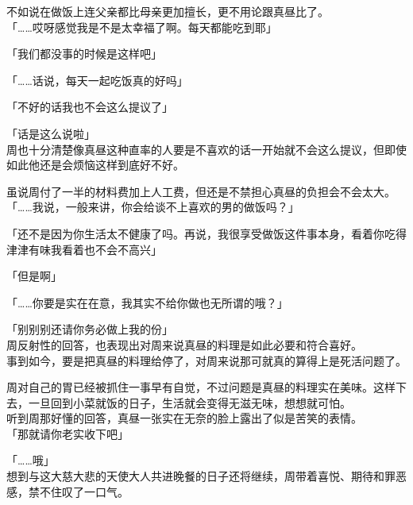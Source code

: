 不如说在做饭上连父亲都比母亲更加擅长，更不用论跟真昼比了。\\

「……哎呀感觉我是不是太幸福了啊。每天都能吃到耶」

「我们都没事的时候是这样吧」

「……话说，每天一起吃饭真的好吗」

「不好的话我也不会这么提议了」

「话是这么说啦」\\

周也十分清楚像真昼这种直率的人要是不喜欢的话一开始就不会这么提议，但即使如此他还是会烦恼这样到底好不好。

虽说周付了一半的材料费加上人工费，但还是不禁担心真昼的负担会不会太大。\\

「……我说，一般来讲，你会给谈不上喜欢的男的做饭吗？」

「还不是因为你生活太不健康了吗。再说，我很享受做饭这件事本身，看着你吃得津津有味我看着也不会不高兴」

「但是啊」

「……你要是实在在意，我其实不给你做也无所谓的哦？」

「别别别还请你务必做上我的份」\\

周反射性的回答，也表现出对周来说真昼的料理是如此必要和符合喜好。\\

事到如今，要是把真昼的料理给停了，对周来说那可就真的算得上是死活问题了。

周对自己的胃已经被抓住一事早有自觉，不过问题是真昼的料理实在美味。这样下去，一旦回到小菜就饭的日子，生活就会变得无滋无味，想想就可怕。\\

听到周那好懂的回答，真昼一张实在无奈的脸上露出了似是苦笑的表情。\\

「那就请你老实收下吧」

「……哦」\\

想到与这大慈大悲的天使大人共进晚餐的日子还将继续，周带着喜悦、期待和罪恶感，禁不住叹了一口气。
